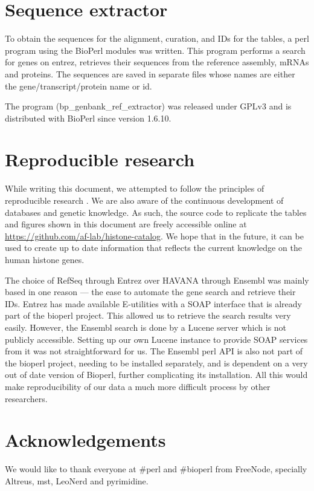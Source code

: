 \documentclass[10pt,a4paper,draft,article]{memoir}
\begin{document}
  \section{Sequence extractor}
    To obtain the sequences for the alignment, curation, and IDs for the tables, a perl program using the
    BioPerl modules was written. This program performs a search for genes on entrez, retrieves
    their sequences from the reference assembly, mRNAs and proteins. The sequences are saved in separate files whose
    names are either the gene/transcript/protein name or id.

    The program (bp\_genbank\_ref\_extractor) was released under GPLv3 and is distributed with
    BioPerl since version 1.6.10.

  \section{Reproducible research}
  \label{sec:reproducible}
    While writing this document, we attempted to follow the principles of reproducible research
    \citep{reproducible-research-bioinformatics, reproducible-research-law}.
    We are also aware of the continuous development of databases and genetic knowledge. As such,
    the source code to replicate the tables and figures shown in this document are freely accessible
    online at \url{https://github.com/af-lab/histone-catalog}. We hope that in the future, it can
    be used to create up to date information
    that reflects the current knowledge on the human histone genes.

    The choice of RefSeq through Entrez over HAVANA through Ensembl was mainly based in one reason --- the ease
    to automate the gene search and retrieve their IDs. Entrez has made available E-utilities with a SOAP interface
    that is already part of the bioperl project. This allowed us to retrieve the search results very easily.
    However, the Ensembl search is done by a Lucene server which is not publicly accessible. Setting up our own
    Lucene instance to provide SOAP services from it was not straightforward for us. The Ensembl perl API is
    also not part of the bioperl project, needing to be installed separately, and is dependent on a very
    out of date version of Bioperl, further complicating its installation. All this would make reproducibility
    of our data a much more difficult process by other researchers.

  \section{Acknowledgements}
    We would like to thank everyone at \#perl and \#bioperl from FreeNode, specially Altreus, mst, LeoNerd and pyrimidine.

  
  
\end{document}
